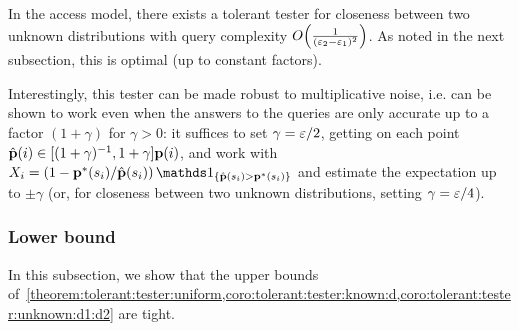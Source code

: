 \begin{corollary}\label{coro:tolerant:tester:unknown:d1:d2}
In the \pdfsamp access model, there exists a tolerant tester for closeness between two unknown distributions with query complexity $\bigO{\frac{1}{(\eps_2-\eps_1)^2}}$. As noted in the next subsection, this is optimal (up to constant factors).
\end{corollary}
  \noindent Interestingly, this tester  can be made robust to multiplicative noise, i.e. can be shown to work even when the answers to the \EVAL queries are only accurate up to a factor $(1+\gamma)$ for $\gamma>0$: it suffices to set $\gamma=\varepsilon/2$, getting on each point $\hat{\mathbf{p}}(i)\in[(1+\gamma)^{-1},1+\gamma]\mathbf{p}(i)$, and work with $X_i = \left(1 - \D^{\ast}(s_i)/\hat{\D}(s_i)\right)\indic{\hat{\D}(s_i)> \D^{\ast}(s_i)}$ and estimate the expectation up to $\pm\gamma$ (or, for closeness between two unknown distributions, setting $\gamma=\varepsilon/4$).
  

\subsubsection{Lower bound}
In this subsection, we show that the upper bounds of~\cref{theorem:tolerant:tester:uniform,coro:tolerant:tester:known:d,coro:tolerant:tester:unknown:d1:d2} are tight.

